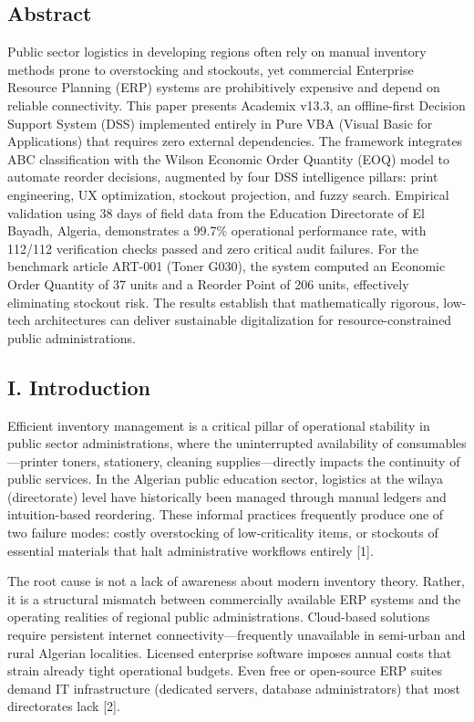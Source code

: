 ﻿\documentclass[conference]{IEEEtran}
\begin{document}
\subsection{Abstract}\label{abstract}

Public sector logistics in developing regions often rely on manual
inventory methods prone to overstocking and stockouts, yet commercial
Enterprise Resource Planning (ERP) systems are prohibitively expensive
and depend on reliable connectivity. This paper presents Academix v13.3,
an offline-first Decision Support System (DSS) implemented entirely in
Pure VBA (Visual Basic for Applications) that requires zero external
dependencies. The framework integrates ABC classification with the
Wilson Economic Order Quantity (EOQ) model to automate reorder
decisions, augmented by four DSS intelligence pillars: print
engineering, UX optimization, stockout projection, and fuzzy search.
Empirical validation using 38 days of field data from the Education
Directorate of El Bayadh, Algeria, demonstrates a 99.7\% operational
performance rate, with 112/112 verification checks passed and zero
critical audit failures. For the benchmark article ART-001 (Toner G030),
the system computed an Economic Order Quantity of 37 units and a Reorder
Point of 206 units, effectively eliminating stockout risk. The results
establish that mathematically rigorous, low-tech architectures can
deliver sustainable digitalization for resource-constrained public
administrations.

\subsection{I. Introduction}\label{i.-introduction}

Efficient inventory management is a critical pillar of operational
stability in public sector administrations, where the uninterrupted
availability of consumables---printer toners, stationery, cleaning
supplies---directly impacts the continuity of public services. In the
Algerian public education sector, logistics at the wilaya (directorate)
level have historically been managed through manual ledgers and
intuition-based reordering. These informal practices frequently produce
one of two failure modes: costly overstocking of low-criticality items,
or stockouts of essential materials that halt administrative workflows
entirely {[}1{]}.

The root cause is not a lack of awareness about modern inventory theory.
Rather, it is a structural mismatch between commercially available ERP
systems and the operating realities of regional public administrations.
Cloud-based solutions require persistent internet
connectivity---frequently unavailable in semi-urban and rural Algerian
localities. Licensed enterprise software imposes annual costs that
strain already tight operational budgets. Even free or open-source ERP
suites demand IT infrastructure (dedicated servers, database
administrators) that most directorates lack {[}2{]}.
\end{document}
